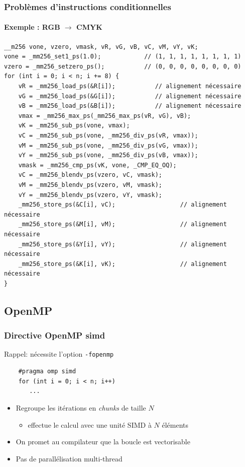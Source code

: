 \documentclass[xcolor={x11names,svgnames}]{beamer}
\begin{document}

\begin{frame}[fragile=singleslide]
  \frametitle{Problèmes d'instructions conditionnelles}
  \framesubtitle{Exemple : RGB $\rightarrow$ CMYK}

\begin{verbatim}
__m256 vone, vzero, vmask, vR, vG, vB, vC, vM, vY, vK;
vone = _mm256_set1_ps(1.0);            // (1, 1, 1, 1, 1, 1, 1, 1)
vzero = _mm256_setzero_ps();           // (0, 0, 0, 0, 0, 0, 0, 0)
for (int i = 0; i < n; i += 8) {
    vR = _mm256_load_ps(&R[i]);           // alignement nécessaire 
    vG = _mm256_load_ps(&G[i]);           // alignement nécessaire
    vB = _mm256_load_ps(&B[i]);           // alignement nécessaire
    vmax = _mm256_max_ps(_mm256_max_ps(vR, vG), vB);
    vK = _mm256_sub_ps(vone, vmax);
    vC = _mm256_sub_ps(vone, _mm256_div_ps(vR, vmax));
    vM = _mm256_sub_ps(vone, _mm256_div_ps(vG, vmax));
    vY = _mm256_sub_ps(vone, _mm256_div_ps(vB, vmax));
    vmask = _mm256_cmp_ps(vK, vone, _CMP_EQ_OQ);
    vC = _mm256_blendv_ps(vzero, vC, vmask);
    vM = _mm256_blendv_ps(vzero, vM, vmask);
    vY = _mm256_blendv_ps(vzero, vY, vmask);
    _mm256_store_ps(&C[i], vC);                  // alignement nécessaire
    _mm256_store_ps(&M[i], vM);                  // alignement nécessaire
    _mm256_store_ps(&Y[i], vY);                  // alignement nécessaire
    _mm256_store_ps(&K[i], vK);                  // alignement nécessaire
}
\end{verbatim}
\end{frame}

\subsection{OpenMP}


\begin{frame}[fragile=singleslide]
  \frametitle{Directive OpenMP simd}

  Rappel: nécessite l'option \texttt{-fopenmp}

  \bigskip
  
  \begin{verbatim}
    #pragma omp simd
    for (int i = 0; i < n; i++)
       ...
  \end{verbatim}

  \begin{itemize}
  \item Regroupe les itérations en \textit{chunks} de taille $N$
    \begin{itemize}
    \item effectue le calcul avec une unité SIMD à $N$ éléments
    \end{itemize}
    
  \item On \og promet\fg{} au compilateur que la boucle est vectorisable
  \item Pas de parallélisation multi-thread 
  \end{itemize}
\end{frame}
\end{document}
